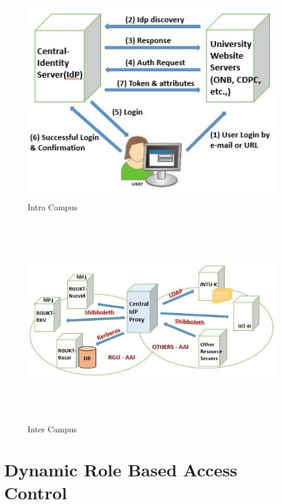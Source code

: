\documentclass[12pt]{report}
\begin{document}
\begin{figure}[H]
\begin{center}
\includegraphics[width=12cm,height=9cm]{U1}
\caption{Intra Campus\label{fig:Intra Campus}}
\end{center}
\end{figure}
\vfill
\begin{figure}[H]
\begin{center}
\includegraphics[width=12cm,height=9cm]{ex1}
\caption{Inter Campus\label{fig:Inter Campus}}
\end{center}
\end{figure}



\newpage
\section{Dynamic Role Based Access Control}
\end{document}
